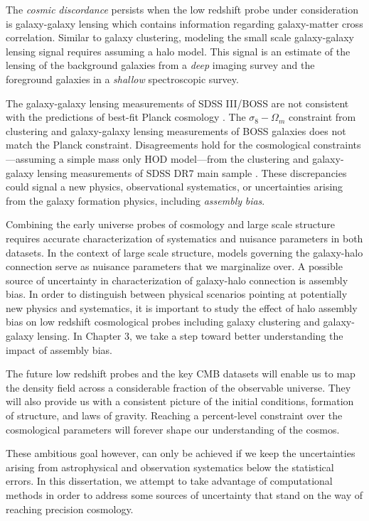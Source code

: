 The \emph{cosmic} \emph{discordance} persists when the low redshift probe under consideration is galaxy-galaxy lensing which contains information regarding galaxy-matter cross correlation. Similar to galaxy clustering, modeling the small scale galaxy-galaxy lensing signal requires assuming a halo model. 
This signal is an estimate of the lensing of the background galaxies from a \emph{deep} imaging survey and the foreground galaxies in a \emph{shallow} spectroscopic survey.

The galaxy-galaxy lensing measurements of SDSS III/BOSS \citep{miyatake15,lensingislow} are not consistent with the predictions of best-fit Planck cosmology \citep{planckII}.
The $\sigma_{8}-\Omega_{m}$ constraint from clustering and galaxy-galaxy lensing measurements of BOSS galaxies \citep{more15} does not match the Planck constraint.
Disagreements hold for the cosmological constraints---assuming a simple mass only HOD model---from the clustering and galaxy-galaxy lensing measurements of SDSS DR7 main sample \citep{cacciato13}. These discrepancies could signal a new physics, observational systematics, or uncertainties arising from the galaxy formation physics, including \emph{assembly} \emph{bias}.

Combining the early universe probes of cosmology and large scale structure requires accurate 
characterization of systematics and nuisance parameters in both datasets. In the context of large scale 
structure, models governing the galaxy-halo connection serve as nuisance parameters that we marginalize over. A possible source of uncertainty in characterization of galaxy-halo connection is assembly bias. In order to distinguish between physical scenarios pointing at potentially new physics and systematics, it is important to study the effect of halo assembly bias on low redshift cosmological probes including galaxy clustering and galaxy-galaxy lensing. In Chapter 3, we take a step toward better understanding the impact of assembly bias. 

The future low redshift probes and the key CMB datasets will enable us to map the 
density field across a considerable fraction of the observable universe. They will also provide us with 
a consistent picture of the initial conditions, formation of structure, and laws of gravity. 
Reaching a percent-level constraint over the cosmological parameters will 
forever shape our understanding of the cosmos. 

These ambitious goal however, can only be achieved if we keep the 
uncertainties arising from astrophysical and observation systematics 
below the statistical errors. In this dissertation, we attempt to take advantage of 
computational methods in order to address some sources of uncertainty that stand on the way of 
reaching precision cosmology. 


